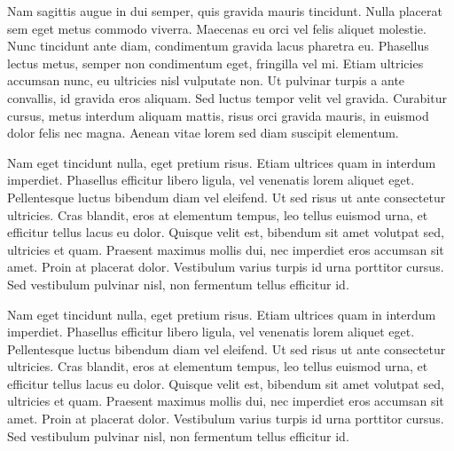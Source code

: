 \documentclass[a4paper,12pt]{article}
\begin{document}
Nam sagittis augue in dui semper, quis gravida mauris tincidunt. Nulla placerat sem eget metus commodo viverra. Maecenas eu orci vel felis aliquet molestie. Nunc tincidunt ante diam, condimentum gravida lacus pharetra eu. Phasellus lectus metus, semper non condimentum eget, fringilla vel mi. Etiam ultricies accumsan nunc, eu ultricies nisl vulputate non. Ut pulvinar turpis a ante convallis, id gravida eros aliquam. Sed luctus tempor velit vel gravida. Curabitur cursus, metus interdum aliquam mattis, risus orci gravida mauris, in euismod dolor felis nec magna. Aenean vitae lorem sed diam suscipit elementum. 

Nam eget tincidunt nulla, eget pretium risus. Etiam ultrices quam in interdum imperdiet. Phasellus efficitur libero ligula, vel venenatis lorem aliquet eget. Pellentesque luctus bibendum diam vel eleifend. Ut sed risus ut ante consectetur ultricies. Cras blandit, eros at elementum tempus, leo tellus euismod urna, et efficitur tellus lacus eu dolor. Quisque velit est, bibendum sit amet volutpat sed, ultricies et quam. Praesent maximus mollis dui, nec imperdiet eros accumsan sit amet. Proin at placerat dolor. Vestibulum varius turpis id urna porttitor cursus. Sed vestibulum pulvinar nisl, non fermentum tellus efficitur id. 

Nam eget tincidunt nulla, eget pretium risus. Etiam ultrices quam in interdum imperdiet. Phasellus efficitur libero ligula, vel venenatis lorem aliquet eget. Pellentesque luctus bibendum diam vel eleifend. Ut sed risus ut ante consectetur ultricies. Cras blandit, eros at elementum tempus, leo tellus euismod urna, et efficitur tellus lacus eu dolor. Quisque velit est, bibendum sit amet volutpat sed, ultricies et quam. Praesent maximus mollis dui, nec imperdiet eros accumsan sit amet. Proin at placerat dolor. Vestibulum varius turpis id urna porttitor cursus. Sed vestibulum pulvinar nisl, non fermentum tellus efficitur id. 

\small
\renewcommand{\markboth}[2]{}


\end{document}
